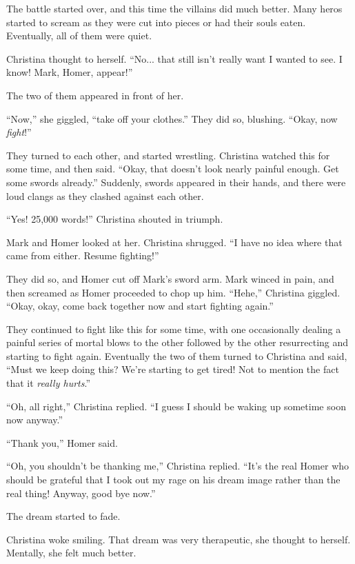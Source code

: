 \documentclass[showtrims,b6paper,draft,10pt]{memoir}
\begin{document}
The battle started over, and this time the villains did much better.  Many heros started to scream as they were cut into pieces or had their souls eaten.  Eventually, all of them were quiet.

Christina thought to herself.  ``No... that still isn't really want I wanted to see.  I know!  Mark, Homer, appear!''

The two of them appeared in front of her.

``Now,'' she giggled, ``take off your clothes.''  They did so, blushing.  ``Okay, now \emph{fight}!''

They turned to each other, and started wrestling.  Christina watched this for some time, and then said.  ``Okay, that doesn't look nearly painful enough.  Get some swords already.''  Suddenly, swords appeared in their hands, and there were loud clangs as they clashed against each other.

``Yes!  25,000 words!'' Christina shouted in triumph.

Mark and Homer looked at her.  Christina shrugged.  ``I have no idea where that came from either.  Resume fighting!''

They did so, and Homer cut off Mark's sword arm.  Mark winced in pain, and then screamed as Homer proceeded to chop up him.  ``Hehe,''  Christina giggled.  ``Okay, okay, come back together now and start fighting again.''

They continued to fight like this for some time, with one occasionally dealing a painful series of mortal blows to the other followed by the other resurrecting and starting to fight again.  Eventually the two of them turned to Christina and said,  ``Must we keep doing this?  We're starting to get tired!  Not to mention the fact that it \emph{really hurts}.''

``Oh, all right,'' Christina replied.  ``I guess I should be waking up sometime soon now anyway.''

``Thank you,'' Homer said.

``Oh, you shouldn't be thanking me,'' Christina replied.  ``It's the real Homer who should be grateful that I took out my rage on his dream image rather than the real thing!  Anyway, good bye now.''

The dream started to fade.

\timeskip

Christina woke smiling.  That dream was very therapeutic, she thought to herself.  Mentally, she felt much better.
\end{document}
